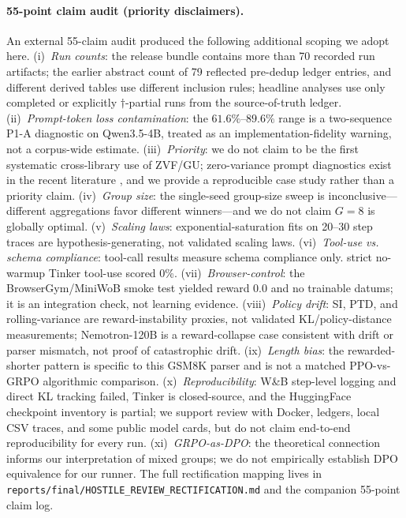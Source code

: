 \paragraph{55-point claim audit (priority disclaimers).}
An external 55-claim audit produced the following additional scoping we adopt
here. (i)~\textit{Run counts}: the release bundle contains more than 70
recorded run artifacts; the earlier abstract count of 79 reflected pre-dedup
ledger entries, and different derived tables use different inclusion rules;
headline analyses use only completed or explicitly $\dagger$-partial runs
from the source-of-truth ledger. (ii)~\textit{Prompt-token loss contamination}:
the $61.6\%$--$89.6\%$ range is a two-sequence P1-A diagnostic on
Qwen3.5-4B, treated as an implementation-fidelity warning, not a corpus-wide
estimate. (iii)~\textit{Priority}: we do not claim to be the first systematic
cross-library use of ZVF/GU; zero-variance prompt diagnostics exist in the
recent literature \citep{rlzvp2025}, and we provide a reproducible case
study rather than a priority claim. (iv)~\textit{Group size}: the single-seed
group-size sweep is inconclusive---different aggregations favor different
winners---and we do not claim $G{=}8$ is globally optimal. (v)~\textit{Scaling
laws}: exponential-saturation fits on 20--30 step traces are
hypothesis-generating, not validated scaling laws. (vi)~\textit{Tool-use vs.
schema compliance}: tool-call results measure schema compliance only.
strict no-warmup Tinker tool-use scored 0\%. (vii)~\textit{Browser-control}: the
BrowserGym/MiniWoB smoke test yielded reward 0.0 and no trainable datums;
it is an integration check, not learning evidence. (viii)~\textit{Policy drift}:
SI, PTD, and rolling-variance are reward-instability proxies, not validated
KL/policy-distance measurements; Nemotron-120B is a reward-collapse case
consistent with drift or parser mismatch, not proof of catastrophic drift.
(ix)~\textit{Length bias}: the rewarded-shorter pattern is specific to this
GSM8K parser and is not a matched PPO-vs-GRPO algorithmic comparison.
(x)~\textit{Reproducibility}: W\&B step-level logging and direct KL tracking
failed, Tinker is closed-source, and the HuggingFace checkpoint inventory is
partial; we support review with Docker, ledgers, local CSV traces, and some
public model cards, but do not claim end-to-end reproducibility for every run.
(xi)~\textit{GRPO-as-DPO}: the theoretical connection
\citep{wu2025grpo_dpo} informs our interpretation of mixed groups; we do not
empirically establish DPO equivalence for our runner. The full rectification
mapping lives in \texttt{reports/final/HOSTILE\_REVIEW\_RECTIFICATION.md} and
the companion 55-point claim log.



